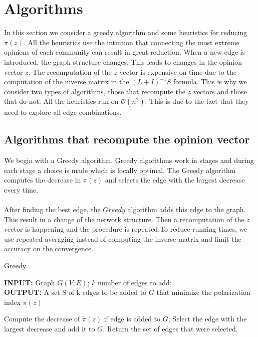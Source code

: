 \chapter{Algorithms}
\label{ch:algorithms}


In this section we  consider a greedy algorithm and some heuristics for reducing $\pi(z)$. All the heuristics use the intuition that connecting the most extreme opinions of each community can result in great reduction. 
When a new edge is introduced, the graph structure changes. This leads to changes in the opinion vector $z$.
The recomputation of the $z$ vector is expensive on time due to the computation of the inverse matrix in the $(L+I)^{-1}S$ formula.
This is why we consider two types of algorithms, those that recompute the $z$ vectors and those that do not.
All the heuristics run on $\mathcal{O}(n^2)$. This is due to the fact that they need to explore all edge combinations.

\section{Algorithms that recompute the opinion vector}
\label{sec:recomputeAlgos}

We begin with a Greedy algorithm. Greedy algorithms work in stages and during each stage a choice is made which is locally optimal.
The Greedy algorithm computes the decrease in $\pi(z)$ and selects the edge with the largest decrease every time.
\\
\\
After finding the best edge, the $Greedy$ algorithm adds this edge to the graph. This result in a change of the network structure.
Then a recomputation of the $z$ vector is happening and  the procedure is repeated.To reduce running times, we  use repeated averaging instead of computing the inverse matrix and limit the accuracy on the convergence.

\vspace{30pt}
    		\begin{algorithm}[H]
		
			\caption{Greedy}
			\label{alg:greedyAlgo}
			
			\begin{flushleft}
        				\textbf{INPUT:} Graph $G(V, E)$; $k$ number of edges to add;
				\vspace{6pt} \\
        				\textbf{OUTPUT:} A set S of k edges to be added to $G$ that minimize the polarization \\
				 index $\pi(z)$
			\end{flushleft}
			
			\begin{algorithmic}[1]
						\STATE Compute the decrease of $\pi(z)$ if edge is added to $G$;
					\ENDFOR
					\STATE Select the edge with the largest decrease and add it to $G$.
				\ENDFOR
				\STATE Return the set of edges that were selected.
			\end{algorithmic}
		\end{algorithm}
\vspace{30pt}

